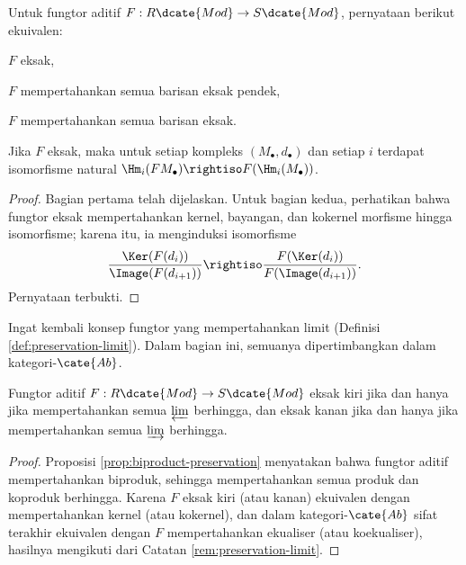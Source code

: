 \begin{proposition}
	Untuk fungtor aditif $F: R\dcate{Mod} \to S\dcate{Mod}$, pernyataan berikut ekuivalen: 
	\begin{compactitem}
		\item $F$ eksak,
		\item $F$ mempertahankan semua barisan eksak pendek,
		\item $F$ mempertahankan semua barisan eksak.
	\end{compactitem}
	Jika $F$ eksak, maka untuk setiap kompleks $(M_\bullet, d_\bullet)$ dan setiap $i$ terdapat isomorfisme natural $\Hm_i(FM_\bullet) \rightiso F(\Hm_i(M_\bullet))$.
\end{proposition}
\begin{proof}
	Bagian pertama telah dijelaskan. Untuk bagian kedua, perhatikan bahwa fungtor eksak mempertahankan kernel, bayangan, dan kokernel morfisme hingga isomorfisme; karena itu, ia menginduksi isomorfisme
	\[ \frac{\Ker(F(d_i))}{\Image(F(d_{i+1}))} \rightiso \frac{F(\Ker(d_i))}{F(\Image(d_{i+1}))}. \]
	Pernyataan terbukti.
\end{proof}

Ingat kembali konsep fungtor yang mempertahankan limit (Definisi \ref{def:preservation-limit}). Dalam bagian ini, semuanya dipertimbangkan dalam kategori-$\cate{Ab}$.
\begin{proposition}
	Fungtor aditif $F: R\dcate{Mod} \to S\dcate{Mod}$ eksak kiri jika dan hanya jika mempertahankan semua $\varprojlim$ berhingga, dan eksak kanan jika dan hanya jika mempertahankan semua $\varinjlim$ berhingga.
\end{proposition}
\begin{proof}
	Proposisi \ref{prop:biproduct-preservation} menyatakan bahwa fungtor aditif mempertahankan biproduk, sehingga mempertahankan semua produk dan koproduk berhingga. Karena $F$ eksak kiri (atau kanan) ekuivalen dengan mempertahankan kernel (atau kokernel), dan dalam kategori-$\cate{Ab}$ sifat terakhir ekuivalen dengan $F$ mempertahankan ekualiser (atau koekualiser), hasilnya mengikuti dari Catatan \ref{rem:preservation-limit}.
\end{proof}
 
